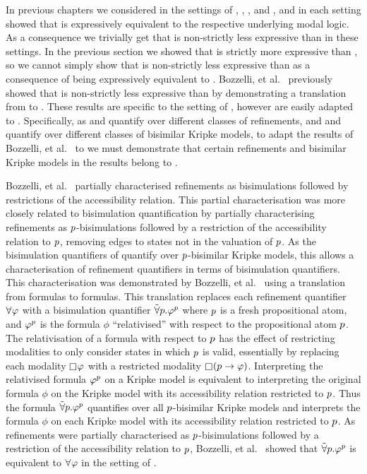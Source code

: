 In previous chapters we considered \logicRml{} in the settings of \classK{}, \classKFF{}, \classKD{}, and \classS{}, and in each setting showed that \logicRml{} is expressively equivalent to the respective underlying modal logic.
As a consequence we trivially get that \logicRml{} is non-strictly less expressive than \logicBqml{} in these settings.
In the previous section we showed that \logicRmlKF{} is strictly more expressive than \logicKF{}, so we cannot simply show that \logicRmlKF{} is non-strictly less expressive than \logicBqmlKF{} as a consequence of \logicRmlKF{} being expressively equivalent to \logicKF{}.
Bozzelli, et al.~\cite{bozzelli:2014b} previously showed that \logicRmlK{} is non-strictly less expressive than \logicBqmlK{} by demonstrating a translation from \langRml{} to \langBqml{}.
These results are specific to the setting of \classK{}, however are easily adapted to \classKF{}.
Specifically, as \logicRmlK{} and \logicRmlKF{} quantify over different classes of refinements, and \logicBqmlK{} and \logicBqmlKF{} quantify over different classes of bisimilar Kripke models, to adapt the results of Bozzelli, et al.~\cite{bozzelli:2014b} to \logicRmlKF{} we must demonstrate that certain refinements and bisimilar Kripke models in the results belong to \classKF{}.

Bozzelli, et al.~\cite{bozzelli:2014b} partially characterised refinements as bisimulations followed by restrictions of the accessibility relation.
This partial characterisation was more closely related to bisimulation quantification by partially characterising refinements as $p$-bisimulations followed by a restriction of the accessibility relation to $p$, removing edges to states not in the valuation of $p$.
As the bisimulation quantifiers of \logicBqml{} quantify over $p$-bisimilar Kripke models, this allows a characterisation of refinement quantifiers in terms of bisimulation quantifiers.
This characterisation was demonstrated by Bozzelli, et al.~\cite{bozzelli:2014b} using a translation from \langRml{} formulas to \langBqml{} formulas.
This translation replaces each refinement quantifier $\allrefs \phi$ with a bisimulation quantifier ${\tilde\forall {p} . } \varphi^p$ where $p$ is a fresh propositional atom, and $\varphi^p$ is the formula $\phi$ ``relativised'' with respect to the propositional atom $p$.
The relativisation of a formula with respect to $p$ has the effect of restricting modalities to only consider states in which $p$ is valid, essentially by replacing each modality $\necessary \phi$ with a restricted modality $\necessary (\atomP \implies \phi)$.
Interpreting the relativised formula $\varphi^p$ on a Kripke model is equivalent to interpreting the original formula $\phi$ on the Kripke model with its accessibility relation restricted to $p$.
Thus the formula ${\tilde\forall {p} . } \varphi^p$ quantifies over all $p$-bisimilar Kripke models and interprets the formula $\phi$ on each Kripke model with its accessibility relation restricted to $p$.
As refinements were partially characterised as $p$-bisimulations followed by a restriction of the accessibility relation to $p$, Bozzelli, et al.~\cite{bozzelli:2014b} showed that ${\tilde\forall {p} . } \varphi^p$ is equivalent to $\allrefs \phi$ in the setting of \classK{}.

